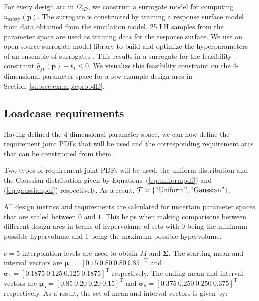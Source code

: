 For every design arc in $\Omega_{cD}$, we construct a surrogate model for computing $n_{\textrm{safety}}(\mathbf{p})$. The surrogate is constructed by training a response surface model from data obtained from the simulation model. 25 \ac{LH} samples from the parameter space are used as training data for the response surface. We use an open source surrogate model library to build and optimize the hyperparameters of an ensemble of surrogates \cite{Talgorn2018}. This results in a surrogate for the feasibility constraint $\hat{g}_{f1}(\mathbf{p}) - t_1 \le 0$. We visualize this feasibility constraint on the 4-dimensional parameter space for a few example design arcs in Section~\ref{subsec:exampleprob4D}. 

\subsection{Loadcase requirements} \label{subsec:loadcasereq}

Having defined the 4-dimensional parameter space, we can now define the requirement joint \acp{PDF} that will be used and the corresponding requirement arcs that can be constructed from them. 

Two types of requirement joint \acp{PDF} will be used, the uniform distribution and the Gaussian distribution given by Equations~(\ref{eq:uniformpdf}) and (\ref{eq:gaussianpdf}) respectively. As a result, $\mathcal{T} = \left\{\mathrm{``Uniform"},\mathrm{``Gaussian"}\right\}$.

All design metrics and requirements are calculated for uncertain parameter spaces that are scaled between $0$ and $1$. This helps when making comparisons between different design arcs in terms of hypervolume of sets with $0$ being the minimum possible hypervolume and $1$ being the maximum possible hypervolume.

$e=5$ interpolation levels are used to obtain $M$ and $\boldsymbol{\Sigma}$. The starting mean and interval vectors are $\boldsymbol{\mu}_1 = \left[0.15 ~ 0.80 ~ 0.80 ~ 0.85\right]^{\mathrm{T}}$ and $\boldsymbol{\sigma}_1 = \left[0.1875 ~ 0.125 ~ 0.125 ~ 0.1875\right]^{\mathrm{T}}$ respectively. The ending mean and interval vectors are $\boldsymbol{\mu}_5 = \left[0.85 ~ 0.20 ~ 0.20 ~ 0.15\right]^{\mathrm{T}}$ and $\boldsymbol{\sigma}_5 = \left[0.375 ~ 0.250 ~ 0.250 ~ 0.375\right]^{\mathrm{T}}$ respectively. As a result, the set of mean and interval vectors is given by:


